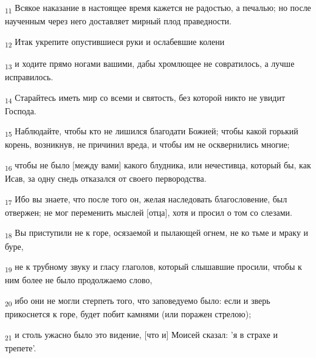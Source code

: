 \begin{tcolorbox}
\textsubscript{11} Всякое наказание в настоящее время кажется не радостью, а печалью; но после наученным через него доставляет мирный плод праведности.
\end{tcolorbox}
\begin{tcolorbox}
\textsubscript{12} Итак укрепите опустившиеся руки и ослабевшие колени
\end{tcolorbox}
\begin{tcolorbox}
\textsubscript{13} и ходите прямо ногами вашими, дабы хромлющее не совратилось, а лучше исправилось.
\end{tcolorbox}
\begin{tcolorbox}
\textsubscript{14} Старайтесь иметь мир со всеми и святость, без которой никто не увидит Господа.
\end{tcolorbox}
\begin{tcolorbox}
\textsubscript{15} Наблюдайте, чтобы кто не лишился благодати Божией; чтобы какой горький корень, возникнув, не причинил вреда, и чтобы им не осквернились многие;
\end{tcolorbox}
\begin{tcolorbox}
\textsubscript{16} чтобы не было [между вами] какого блудника, или нечестивца, который бы, как Исав, за одну снедь отказался от своего первородства.
\end{tcolorbox}
\begin{tcolorbox}
\textsubscript{17} Ибо вы знаете, что после того он, желая наследовать благословение, был отвержен; не мог переменить мыслей [отца], хотя и просил о том со слезами.
\end{tcolorbox}
\begin{tcolorbox}
\textsubscript{18} Вы приступили не к горе, осязаемой и пылающей огнем, не ко тьме и мраку и буре,
\end{tcolorbox}
\begin{tcolorbox}
\textsubscript{19} не к трубному звуку и гласу глаголов, который слышавшие просили, чтобы к ним более не было продолжаемо слово,
\end{tcolorbox}
\begin{tcolorbox}
\textsubscript{20} ибо они не могли стерпеть того, что заповедуемо было: если и зверь прикоснется к горе, будет побит камнями (или поражен стрелою);
\end{tcolorbox}
\begin{tcolorbox}
\textsubscript{21} и столь ужасно было это видение, [что и] Моисей сказал: 'я в страхе и трепете'.
\end{tcolorbox}
